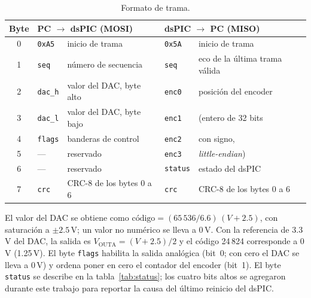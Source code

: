\documentclass[11pt]{article}
\newcommand{\code}[1]{\texttt{#1}}
\begin{document}
\begin{table}[H]
\centering
\small
\begin{tabular}{@{}cll|ll@{}}
\toprule
Byte & \multicolumn{2}{l|}{PC $\to$ dsPIC (MOSI)} & \multicolumn{2}{l}{dsPIC $\to$ PC (MISO)} \\ \midrule
0   & \code{0xA5}   & inicio de trama              & \code{0x5A}   & inicio de trama \\
1   & \code{seq}    & número de secuencia          & \code{seq}    & eco de la última trama válida \\
2   & \code{dac\_h} & valor del DAC, byte alto     & \code{enc0}   & posición del encoder \\
3   & \code{dac\_l} & valor del DAC, byte bajo     & \code{enc1}   & (entero de 32 bits \\
4   & \code{flags}  & banderas de control          & \code{enc2}   & con signo, \\
5   & ---           & reservado                    & \code{enc3}   & \emph{little-endian}) \\
6   & ---           & reservado                    & \code{status} & estado del dsPIC \\
7   & \code{crc}    & CRC-8 de los bytes 0 a 6     & \code{crc}    & CRC-8 de los bytes 0 a 6 \\
\bottomrule
\end{tabular}
\caption{Formato de trama.}
\label{tab:trama}
\end{table}

El valor del DAC se obtiene como $\text{código} = (65\,536/6.6)\,(V + 2.5)$,
con saturación a $\pm2.5$\,V; un valor no numérico se lleva a 0\,V. Con la
referencia de 3.3\,V del DAC, la salida es $V_{\text{OUTA}} = (V + 2.5)/2$ y
el código 24\,824 corresponde a 0\,V (1.25\,V). El byte \code{flags} habilita la salida
analógica (bit~0; con cero el DAC se lleva a 0\,V) y ordena poner en cero el
contador del encoder (bit~1). El byte \code{status} se describe en la
tabla~\ref{tab:status}; los cuatro bits altos se agregaron durante este
trabajo para reportar la causa del último reinicio del dsPIC.
\end{document}
